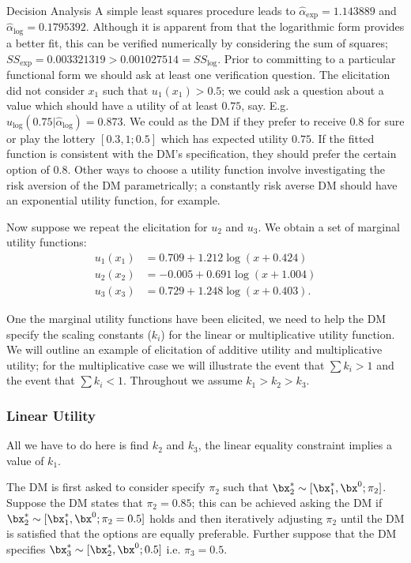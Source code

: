 \begin{chapter}{Decision Analysis \label{Ch:decision}}
A simple least squares procedure leads to $\hat{\alpha}_{\text{exp}} = 1.143889$ and $\hat{\alpha}_{\text{log}} = 0.1795392$. Although it is apparent from  that the logarithmic form provides a better fit, this can be verified numerically by considering the sum of squares; $SS_{\text{exp}} = 0.003321319 > 0.001027514 =  SS_{\text{log}}$. Prior to committing to a particular functional form we should ask at least one verification question. The elicitation did not consider $x_1$ such that $u_1(x_1) > 0.5$; we could ask a question about a value which should have a utility of at least $0.75$, say. E.g. $u_{\text{log}}(0.75 | \hat{\alpha}_{\text{log}}) = 0.873$. We could as the DM if they prefer to receive $0.8$ for sure or play the lottery $[0.3,1;0.5]$ which has expected utility $0.75$. If the fitted function is consistent with the DM's specification, they should prefer the certain option of $0.8$. Other ways to choose a utility function involve investigating the risk aversion of the DM parametrically; a constantly risk averse DM should have an exponential utility function, for example.

Now suppose we repeat the elicitation for $u_2$ and $u_3$. We obtain a set of marginal utility functions:
\begin{align}
u_1(x_1) & = 0.709+1.212\log(x+0.424) \\
u_2(x_2) & = −0.005+0.691\log(x+1.004)\\
u_3(x_3) & = 0.729+1.248\log(x+0.403).
\end{align}

One the marginal utility functions have been elicited, we need to help the DM specify the scaling constants ($k_i$) for the linear or multiplicative utility function. We will outline an example of elicitation of additive utility and multiplicative utility; for the multiplicative case we will illustrate the event that $\sum k_i > 1$ and the event that $\sum k_i < 1$. Throughout we assume $k_1>k_2>k_3$.

\subsubsection{Linear Utility}

All we have to do here is find $k_2$ and $k_3$, the linear equality constraint implies a value of $k_1$.

The DM is first asked to consider specify $\pi_2$ such that $\bx_2^* \sim [\bx_1^*, \bx^0; \pi_2]$. Suppose the DM states that $\pi_2 = 0.85$; this can be achieved asking the DM if $\bx_2^* \sim [\bx_1^*, \bx^0; \pi_2 = 0.5]$ holds and then iteratively adjusting $\pi_2$ until the DM is satisfied that the options are equally preferable. Further suppose that the DM specifies $\bx_3^* \sim [\bx_2^*, \bx^0; 0.5]$ i.e. $\pi_3 = 0.5$.


\end{chapter}
